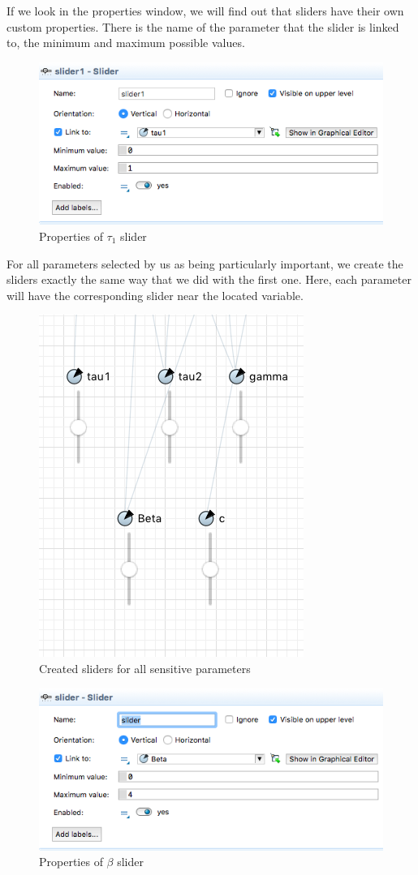 If we look in the properties window, we will find out that sliders have their own custom properties. There is the name of the parameter that the slider is linked to, the minimum and maximum possible values.

\begin{figure}[H]
  \centering
  \includegraphics[height=0.3\textwidth]{img/screens/sliders/sliders7}
  \caption{Properties of $\tau_1$ slider}
\end{figure}

For all parameters selected by us as being particularly important, we create the sliders exactly the same way that we did with the first one. Here, each parameter will have the corresponding slider near the located variable.

\begin{figure}[H]
  \centering
  \includegraphics[height=0.5\textwidth]{img/screens/sliders/sliders3}
  \caption{Created sliders for all sensitive parameters}
\end{figure}

\begin{figure}[H]
  \centering
  \includegraphics[height=0.3\textwidth]{img/screens/sliders/sliders6}
  \caption{Properties of $\beta$ slider}
\end{figure}

